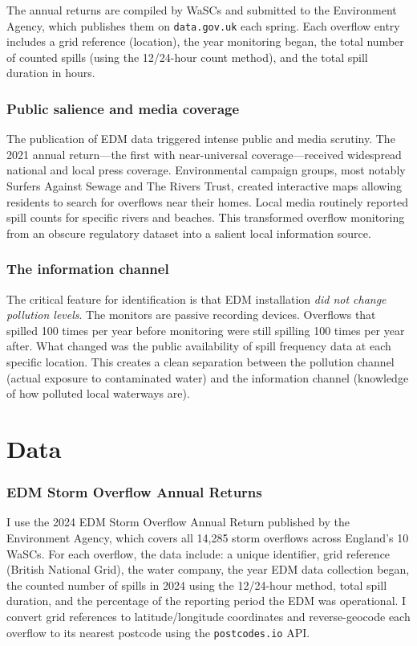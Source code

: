 \documentclass[12pt]{article}
\begin{document}
The annual returns are compiled by WaSCs and submitted to the Environment Agency, which publishes them on \texttt{data.gov.uk} each spring. Each overflow entry includes a grid reference (location), the year monitoring began, the total number of counted spills (using the 12/24-hour count method), and the total spill duration in hours.

\subsubsection*{Public salience and media coverage} The publication of EDM data triggered intense public and media scrutiny. The 2021 annual return---the first with near-universal coverage---received widespread national and local press coverage. Environmental campaign groups, most notably Surfers Against Sewage and The Rivers Trust, created interactive maps allowing residents to search for overflows near their homes. Local media routinely reported spill counts for specific rivers and beaches. This transformed overflow monitoring from an obscure regulatory dataset into a salient local information source.

\subsubsection*{The information channel} The critical feature for identification is that EDM installation \textit{did not change pollution levels}. The monitors are passive recording devices. Overflows that spilled 100 times per year before monitoring were still spilling 100 times per year after. What changed was the public availability of spill frequency data at each specific location. This creates a clean separation between the pollution channel (actual exposure to contaminated water) and the information channel (knowledge of how polluted local waterways are).


\section{Data}
\label{sec:data}

\subsubsection*{EDM Storm Overflow Annual Returns} I use the 2024 EDM Storm Overflow Annual Return published by the Environment Agency, which covers all 14,285 storm overflows across England's 10 WaSCs. For each overflow, the data include: a unique identifier, grid reference (British National Grid), the water company, the year EDM data collection began, the counted number of spills in 2024 using the 12/24-hour method, total spill duration, and the percentage of the reporting period the EDM was operational. I convert grid references to latitude/longitude coordinates and reverse-geocode each overflow to its nearest postcode using the \texttt{postcodes.io} API.
\end{document}

